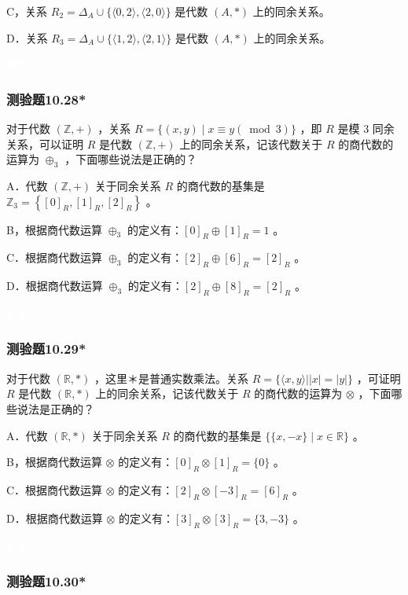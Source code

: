 \documentclass[UTF8, heading=true]{ctexart}
\begin{document}
C，关系 $R_2=\Delta_A \cup\{\langle 0,2\rangle,\langle 2,0\rangle\}$ 是代数 $(A, *)$ 上的同余关系。

D．关系 $R_3=\Delta_A \cup\{\langle 1,2\rangle,\langle 2,1\rangle\}$ 是代数 $(A, *)$ 上的同余关系。

\textcolor{white}{答案：ABD}

\subsubsection{测验题10.28*}

对于代数 $(\mathbb{Z},+)$ ，关系 $R=\{(x, y) \mid x \equiv y(\bmod 3)\}$ ，即 $R$ 是模 3 同余关系，可以证明 $R$ 是代数 $(\mathbb{Z},+)$ 上的同余关系，记该代数关于 $R$ 的商代数的运算为 $\oplus_3$ ，下面哪些说法是正确的？

A．代数 $(\mathbb{Z},+)$ 关于同余关系 $R$ 的商代数的基集是 $\mathbb{Z}_3=\left\{[0]_R,[1]_R,[2]_R\right\}$ 。

B，根据商代数运算 $\oplus_3$ 的定义有：$[0]_R \oplus[1]_R=1$ 。

C．根据商代数运算 $\oplus_3$ 的定义有：$[2]_R \oplus[6]_R=[2]_R$ 。

D．根据商代数运算 $\oplus_3$ 的定义有：$[2]_R \oplus[8]_R=[2]_R$ 。

\textcolor{white}{答案：AD}

\subsubsection{测验题10.29*}

对于代数 $(\mathbb{R}, *)$ ，这里＊是普通实数乘法。关系 $R=\{\langle x, y\rangle| | x|=|y|\}$ ，可证明 $R$ 是代数 $(\mathbb{R}, *)$ 上的同余关系，记该代数关于 $R$ 的商代数的运算为 $\otimes$ ，下面哪些说法是正确的？

A．代数 $(\mathbb{R}, *)$ 关于同余关系 $R$ 的商代数的基集是 $\{\{x,-x\} \mid x \in \mathbb{R}\}$ 。

B，根据商代数运算 $\otimes$ 的定义有：$[0]_R \otimes[1]_R=\{0\}$ 。

C．根据商代数运算 $\otimes$ 的定义有：$[2]_R \otimes[-3]_R=[6]_R$ 。

D．根据商代数运算 $\otimes$ 的定义有：$[3]_R \otimes[3]_R=\{3,-3\}$ 。

\textcolor{white}{答案：ABC}

\subsubsection{测验题10.30*}
\end{document}
